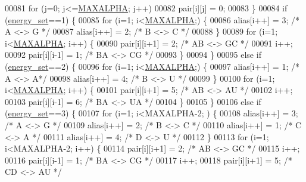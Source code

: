 \begin{DoxyCode}
00081          \textcolor{keywordflow}{for} (j=0; j<=\hyperlink{group__model__details_ga05a5ffe718aa431d97419a12fb082379}{MAXALPHA}; j++)
00082             pair[i][j] = 0;
00083       \}
00084       \textcolor{keywordflow}{if} (\hyperlink{group__model__details_gafb1ef1166da85092ae8a325e02dcae71}{energy\_set}==1) \{
00085          \textcolor{keywordflow}{for} (i=1; i<\hyperlink{group__model__details_ga05a5ffe718aa431d97419a12fb082379}{MAXALPHA};) \{
00086             alias[i++] = 3;  \textcolor{comment}{/* A <-> G */}
00087             alias[i++] = 2;  \textcolor{comment}{/* B <-> C */}
00088          \}
00089          \textcolor{keywordflow}{for} (i=1; i<\hyperlink{group__model__details_ga05a5ffe718aa431d97419a12fb082379}{MAXALPHA}; i++) \{
00090             pair[i][i+1] = 2;    \textcolor{comment}{/* AB <-> GC */}
00091             i++;
00092             pair[i][i-1] = 1;    \textcolor{comment}{/* BA <-> CG */}
00093          \}
00094       \}
00095       \textcolor{keywordflow}{else} \textcolor{keywordflow}{if} (\hyperlink{group__model__details_gafb1ef1166da85092ae8a325e02dcae71}{energy\_set}==2) \{
00096         \textcolor{keywordflow}{for} (i=1; i<\hyperlink{group__model__details_ga05a5ffe718aa431d97419a12fb082379}{MAXALPHA};) \{
00097             alias[i++] = 1;  \textcolor{comment}{/* A <-> A*/}
00098             alias[i++] = 4;  \textcolor{comment}{/* B <-> U */}
00099          \}
00100          \textcolor{keywordflow}{for} (i=1; i<\hyperlink{group__model__details_ga05a5ffe718aa431d97419a12fb082379}{MAXALPHA}; i++) \{
00101             pair[i][i+1] = 5;    \textcolor{comment}{/* AB <-> AU */}
00102             i++;
00103             pair[i][i-1] = 6;    \textcolor{comment}{/* BA <-> UA */}
00104          \}
00105       \}
00106       \textcolor{keywordflow}{else} \textcolor{keywordflow}{if} (\hyperlink{group__model__details_gafb1ef1166da85092ae8a325e02dcae71}{energy\_set}==3) \{
00107         \textcolor{keywordflow}{for} (i=1; i<MAXALPHA-2; ) \{
00108           alias[i++] = 3;  \textcolor{comment}{/* A <-> G */}
00109           alias[i++] = 2;  \textcolor{comment}{/* B <-> C */}
00110           alias[i++] = 1;  \textcolor{comment}{/* C <-> A */}
00111           alias[i++] = 4;  \textcolor{comment}{/* D <-> U */}
00112         \}
00113         \textcolor{keywordflow}{for} (i=1; i<MAXALPHA-2; i++) \{
00114           pair[i][i+1] = 2;    \textcolor{comment}{/* AB <-> GC */}
00115           i++;
00116           pair[i][i-1] = 1;    \textcolor{comment}{/* BA <-> CG */}
00117           i++;
00118           pair[i][i+1] = 5;    \textcolor{comment}{/* CD <-> AU */}

\end{DoxyCode}
